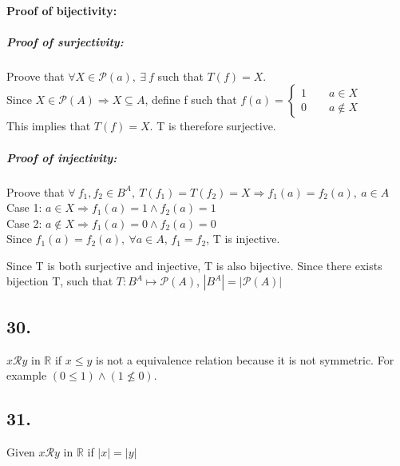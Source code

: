 \documentclass{article}
\begin{document}
	\paragraph{Proof of bijectivity:} 
		\subparagraph{Proof of surjectivity: } Proove that 
			$\forall X \in \mathcal{P}(a),\ \exists\ f$ such that $T(f)=X$.\\
			Since $X\in\mathcal{P}(A)\Rightarrow X\subseteq A$, define f such that 
			$f(a) = \begin{cases}
				1 \qquad a\in X\\
				0 \qquad a\notin X
			\end{cases}$ \\
			This implies that $T(f)=X$. T is therefore surjective.
		\subparagraph{Proof of injectivity: } Proove that
			$\forall\ f_1,f_2\in B^A,\ T(f_1) = T(f_2) = X \Rightarrow f_1(a)=f_2(a),\
			a\in A$\\
			Case 1: $a \in X \Rightarrow f_1(a) = 1 \wedge f_2(a) = 1$\\
			Case 2: $a \notin X \Rightarrow f_1(a) = 0 \wedge f_2(a) = 0$\\
			Since $f_1(a) = f_2(a),\ \forall a \in A$, $f_1 = f_2$, T is injective. \\
		\par Since T is both surjective and injective, T is also bijective. 
		Since there exists bijection T, such that $T:B^A \mapsto \mathcal{P}(A)$, 
		$|B^A| = |\mathcal{P}(A)|$
		

\subsection*{30.}
$x\mathcal{R}y$ in $\mathbb{R}$ if $x \leq y$ is not a equivalence relation
because it is not symmetric. For example $(0 \leq 1) \wedge (1 \nleq 0)$.

\subsection*{31.}
Given $x\mathcal{R}y$ in $\mathbb{R}$ if $|x| = |y|$
\end{document}

